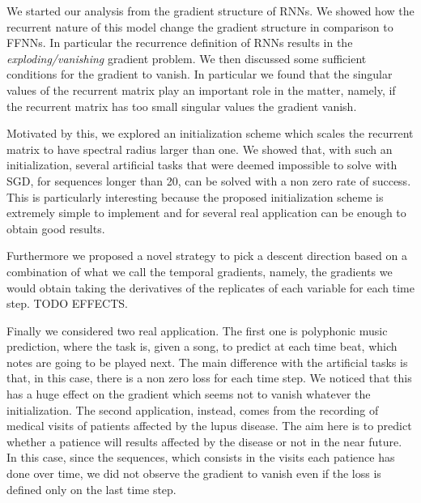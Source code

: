 We started our analysis from the gradient structure of RNNs. We showed how the recurrent nature of this model change the gradient structure in comparison to FFNNs. In particular the recurrence definition of RNNs results in the \textit{exploding/vanishing} gradient problem. We then discussed some sufficient conditions for the gradient to vanish. In particular we found that the singular values of the recurrent matrix play an important role in the matter, namely, if the recurrent matrix has too small singular values the gradient vanish.

Motivated by this, we explored an initialization scheme which scales the recurrent matrix to have spectral radius larger than one. We showed that, with such an initialization, several artificial tasks that were deemed impossible to solve with SGD, for sequences longer than 20, can be solved with a non zero rate of success. This is particularly interesting because the proposed initialization scheme is extremely simple to implement and for several real application can be enough to obtain good results. 

Furthermore we proposed a novel strategy to pick a descent direction based on a combination of what we call the temporal gradients, namely, the gradients we would obtain taking the derivatives of the replicates of each variable for each time step. TODO EFFECTS. 

Finally we considered two real application. The first one is polyphonic music prediction, where the task is, given a song, to predict at each time beat, which notes are going to be played next. The main difference with the artificial tasks is that, in this case, there is a non zero loss for each time step. We noticed that this has a huge effect on the gradient which seems not to vanish whatever the initialization. The second application, instead, comes from the recording of medical visits of patients affected by the lupus disease. The aim here is to predict whether a patience will results affected by the disease or not in the near future. In this case, since the sequences, which consists in the visits each patience has done over time, we did not observe the gradient to vanish even if the loss is defined only on the last time step. 